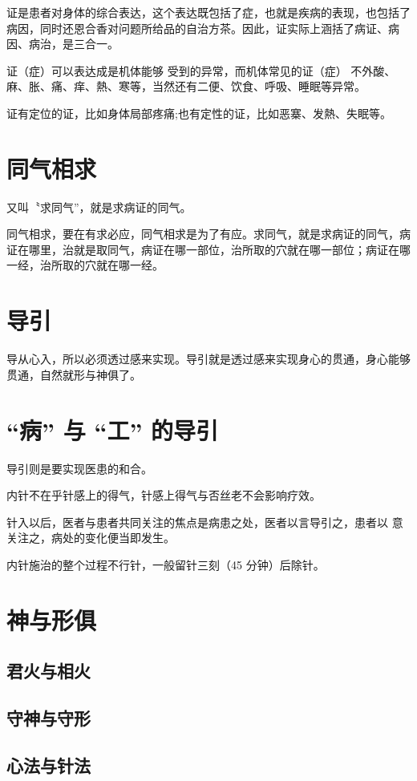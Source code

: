 \documentclass[
]{book}
\begin{document}
证是患者对身体的综合表达，这个表达既包括了症，也就是疾病的表现，也包括了病因，同时还恩合香对问题所给品的自治方茶。因此，证实际上涵括了病证、病因、病治，是三合一。

证（症）可以表达成是机体能够 受到的异常，而机体常见的证（症）
不外酸、麻、胀、痛、痒、熱、寒等，当然还有二便、饮食、呼吸、睡眠等异常。

证有定位的证，比如身体局部疼痛;也有定性的证，比如恶寨、发熱、失眠等。

\section{同气相求}\label{ux540cux6c14ux76f8ux6c42}

又叫〝求同气''，就是求病证的同气。

同气相求，要在有求必应，同气相求是为了有应。求同气，就是求病证的同气，病证在哪里，治就是取同气，病证在哪一部位，治所取的穴就在哪一部位；病证在哪一经，治所取的穴就在哪一经。

\section{导引}\label{ux5bfcux5f15}

导从心入，所以必须透过感来实现。导引就是透过感来实现身心的贯通，身心能够贯通，自然就形与神俱了。

\section{``病'' 与 ``工'' 的导引}\label{ux75c5-ux4e0e-ux5de5-ux7684ux5bfcux5f15}

导引则是要实现医患的和合。

内针不在乎针感上的得气，针感上得气与否丝老不会影响疗效。

针入以后，医者与患者共同关注的焦点是病患之处，医者以言导引之，患者以
意关注之，病处的变化便当即发生。

内针施治的整个过程不行针，一般留针三刻（45 分钟）后除针。

\section{神与形俱}\label{ux795eux4e0eux5f62ux4ff1}

\subsection{君火与相火}\label{ux541bux706bux4e0eux76f8ux706b}

\subsection{守神与守形}\label{ux5b88ux795eux4e0eux5b88ux5f62}

\subsection{心法与针法}\label{ux5fc3ux6cd5ux4e0eux9488ux6cd5}

\printbibliography
\end{document}
